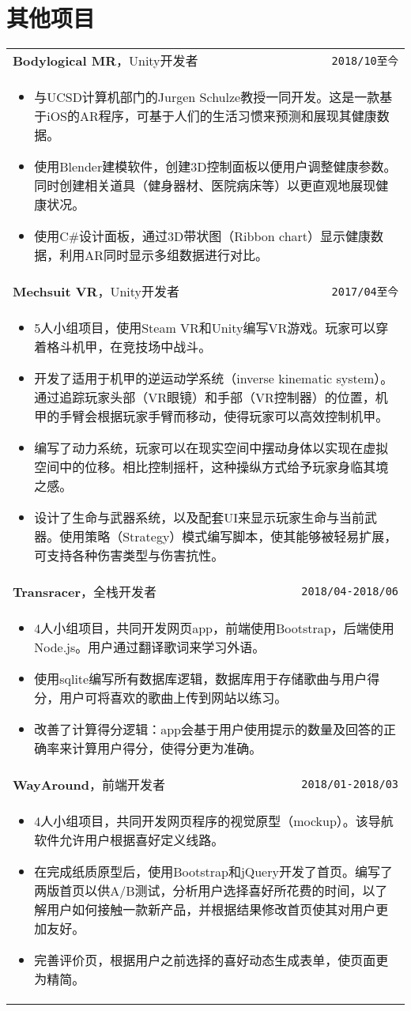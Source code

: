 \documentclass[UTF8]{ctexart}
\newcommand{\itemcols}[1]{
	\multicolumn{2}{p{\dimexpr \linewidth-2\tabcolsep}}{
		\begin{itemize}
			#1
		\end{itemize}
	}
}
\begin{document}
	
	\section{其他项目}
	\smallskip
	\noindent
	\begin{tabularx}{\linewidth}{X r}
		\textbf{\large Bodylogical MR}，Unity开发者 & \texttt{2018/10至今} \\
		\itemcols{
			\item 与UCSD计算机部门的Jurgen Schulze教授一同开发。这是一款基于iOS的AR程序，可基于人们的生活习惯来预测和展现其健康数据。 
			\item 使用Blender建模软件，创建3D控制面板以便用户调整健康参数。同时创建相关道具（健身器材、医院病床等）以更直观地展现健康状况。
			\item 使用C\#设计面板，通过3D带状图（Ribbon chart）显示健康数据，利用AR同时显示多组数据进行对比。
		} \\
		
		\textbf{\large Mechsuit VR}，Unity开发者 & \texttt{2017/04至今} \\
		\itemcols{
			\item 5人小组项目，使用Steam VR和Unity编写VR游戏。玩家可以穿着格斗机甲，在竞技场中战斗。
			\item 开发了适用于机甲的逆运动学系统（inverse kinematic system）。通过追踪玩家头部（VR眼镜）和手部（VR控制器）的位置，机甲的手臂会根据玩家手臂而移动，使得玩家可以高效控制机甲。
			\item 编写了动力系统，玩家可以在现实空间中摆动身体以实现在虚拟空间中的位移。相比控制摇杆，这种操纵方式给予玩家身临其境之感。
			\item 设计了生命与武器系统，以及配套UI来显示玩家生命与当前武器。使用策略（Strategy）模式编写脚本，使其能够被轻易扩展，可支持各种伤害类型与伤害抗性。
		} \\
		
		\textbf{\large Transracer}，全栈开发者 & \texttt{2018/04-2018/06} \\
		\itemcols{
			\item 4人小组项目，共同开发网页app，前端使用Bootstrap，后端使用Node.js。用户通过翻译歌词来学习外语。
			\item 使用sqlite编写所有数据库逻辑，数据库用于存储歌曲与用户得分，用户可将喜欢的歌曲上传到网站以练习。
			\item 改善了计算得分逻辑：app会基于用户使用提示的数量及回答的正确率来计算用户得分，使得分更为准确。
		} \\
		
		\textbf{\large WayAround}，前端开发者 & \texttt{2018/01-2018/03} \\
		\itemcols{
			\item 4人小组项目，共同开发网页程序的视觉原型（mockup）。该导航软件允许用户根据喜好定义线路。
			\item 在完成纸质原型后，使用Bootstrap和jQuery开发了首页。编写了两版首页以供A/B测试，分析用户选择喜好所花费的时间，以了解用户如何接触一款新产品，并根据结果修改首页使其对用户更加友好。
			\item 完善评价页，根据用户之前选择的喜好动态生成表单，使页面更为精简。	
		} \\
		

\end{tabularx}
\end{document}
